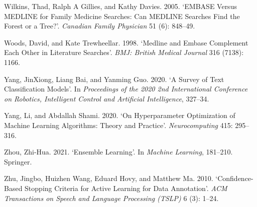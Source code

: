 \documentclass{article}
\newlength{\cslhangindent}
\newlength{\cslentryspacingunit} %
\newenvironment{CSLReferences}[2] %
 {%
  \setlength{\parindent}{0pt}
  \ifodd #1
  \let\oldpar\par
  \def\par{\hangindent=\cslhangindent\oldpar}
  \fi
  \setlength{\parskip}{#2\cslentryspacingunit}
 }%
 {}
\begin{document}
\begin{CSLReferences}{1}{0}
\leavevmode{}%
Wilkins, Thad, Ralph A Gillies, and Kathy Davies. 2005. {`EMBASE Versus
MEDLINE for Family Medicine Searches: Can MEDLINE Searches Find the
Forest or a Tree?'}. \emph{Canadian Family Physician} 51 (6): 848--49.

\leavevmode{}%
Woods, David, and Kate Trewheellar. 1998. {`Medline and Embase
Complement Each Other in Literature Searches'}. \emph{BMJ: British
Medical Journal} 316 (7138): 1166.

\leavevmode{}%
Yang, JinXiong, Liang Bai, and Yanming Guo. 2020. {`A Survey of Text
Classification Models'}. In \emph{Proceedings of the 2020 2nd
International Conference on Robotics, Intelligent Control and Artificial
Intelligence}, 327--34.

\leavevmode{}%
Yang, Li, and Abdallah Shami. 2020. {`On Hyperparameter Optimization of
Machine Learning Algorithms: Theory and Practice'}.
\emph{Neurocomputing} 415: 295--316.

\leavevmode{}%
Zhou, Zhi-Hua. 2021. {`Ensemble Learning'}. In \emph{Machine Learning},
181--210. Springer.

\leavevmode{}%
Zhu, Jingbo, Huizhen Wang, Eduard Hovy, and Matthew Ma. 2010.
{`Confidence-Based Stopping Criteria for Active Learning for Data
Annotation'}. \emph{ACM Transactions on Speech and Language Processing
(TSLP)} 6 (3): 1--24.

\end{CSLReferences}



\end{document}

